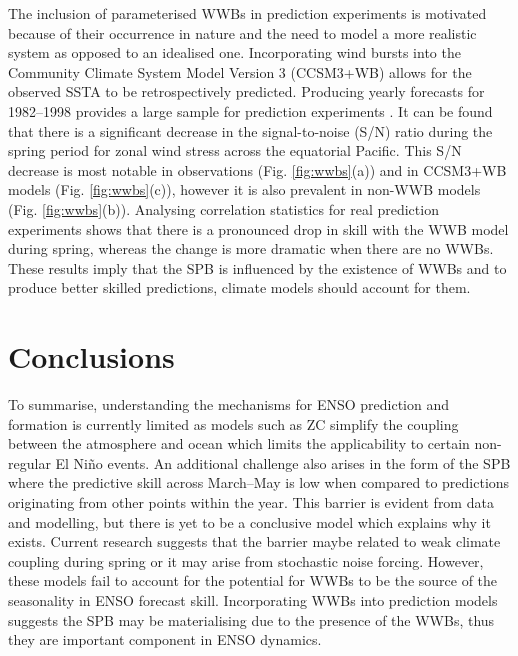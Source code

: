 \documentclass[12pt, onecolumn]{revtex4}    %
\begin{document}
The inclusion of parameterised WWBs in prediction experiments is motivated because of their occurrence in nature and the need to model a more realistic system as opposed to an idealised one. Incorporating wind bursts into the Community Climate System Model Version 3 \citep{collins2006community} (CCSM3+WB) allows for the observed SSTA to be retrospectively predicted. Producing yearly forecasts for 1982--1998 provides a large sample for prediction experiments \citep{lopez2014wwbs}. It can be found that there is a significant decrease in the signal-to-noise (S/N) ratio during the spring period for zonal wind stress across the equatorial Pacific. This S/N decrease is most notable in observations (Fig. \ref{fig:wwbs}(a)) and in CCSM3+WB models (Fig. \ref{fig:wwbs}(c)), however it is also prevalent in non-WWB models (Fig. \ref{fig:wwbs}(b)). Analysing correlation statistics for real prediction experiments shows that there is a pronounced drop in skill with the WWB model during spring, whereas the change is more dramatic when there are no WWBs. These results imply that the SPB is influenced by the existence of WWBs and to produce better skilled predictions, climate models should account for them.

\section{Conclusions}

To summarise, understanding the mechanisms for ENSO prediction and formation is currently limited as models such as ZC simplify the coupling between the atmosphere and ocean which limits the applicability to certain non-regular El Ni\~{n}o events. An additional challenge also arises in the form of the SPB where the predictive skill across March--May is low when compared to predictions originating from other points within the year. This barrier is evident from data and modelling, but there is yet to be a conclusive model which explains why it exists. Current research suggests that the barrier maybe related to weak climate coupling during spring or it may arise from stochastic noise forcing. However, these models fail to account for the potential for WWBs to be the source of the seasonality in ENSO forecast skill. Incorporating WWBs into prediction models suggests the SPB may be materialising due to the presence of the WWBs, thus they are important component in ENSO dynamics.


\clearpage



\end{document}

